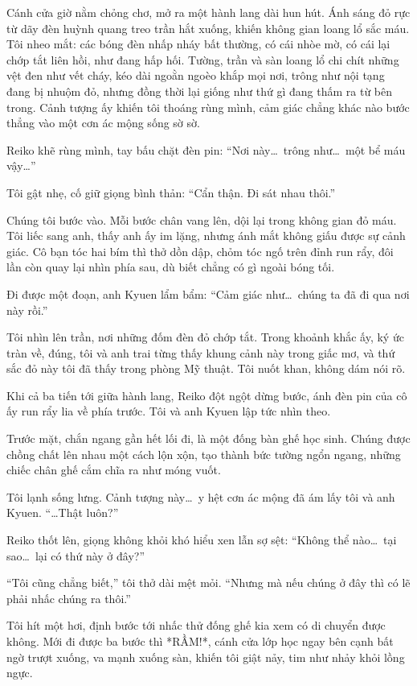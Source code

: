 \documentclass[../main.tex]{subfiles}
\begin{document}
Cánh cửa giờ nằm chỏng chơ, mở ra một hành lang dài hun hút. Ánh sáng đỏ rực từ dãy đèn huỳnh quang treo trần hắt xuống, khiến không gian loang lổ sắc máu. Tôi nheo mắt: các bóng đèn nhấp nháy bất thường, có cái nhòe mờ, có cái lại chớp tắt liên hồi, như đang hấp hối. Tường, trần và sàn loang lổ chi chít những vệt đen như vết cháy, kéo dài ngoằn ngoèo khắp mọi nơi, trông như nội tạng đang bị nhuộm đỏ, nhưng đồng thời lại giống như thứ gì đang thấm ra từ bên trong. Cảnh tượng ấy khiến tôi thoáng rùng mình, cảm giác chẳng khác nào bước thẳng vào một cơn ác mộng sống sờ sờ.


Reiko khẽ rùng mình, tay bấu chặt đèn pin: ``Nơi này\dots\ trông như\dots\ một bể máu vậy\dots''

Tôi gật nhẹ, cố giữ giọng bình thản: ``Cẩn thận. Đi sát nhau thôi.''

Chúng tôi bước vào. Mỗi bước chân vang lên, dội lại trong không gian đỏ máu. Tôi liếc sang anh, thấy anh ấy im lặng, nhưng ánh mắt không giấu được sự cảnh giác. Cô bạn tóc hai bím thì thở dồn dập, chỏm tóc ngố trên đỉnh run rẩy, đôi lần còn quay lại nhìn phía sau, dù biết chẳng có gì ngoài bóng tối.

Đi được một đoạn, anh Kyuen lẩm bẩm: ``Cảm giác như\dots\ chúng ta đã đi qua nơi này rồi.''

Tôi nhìn lên trần, nơi những đốm đèn đỏ chớp tắt. Trong khoảnh khắc ấy, ký ức tràn về, đúng, tôi và anh trai từng thấy khung cảnh này trong giấc mơ, và thứ sắc đỏ này tôi đã thấy trong phòng Mỹ thuật. Tôi nuốt khan, không dám nói rõ.

Khi cả ba tiến tới giữa hành lang, Reiko đột ngột dừng bước, ánh đèn pin của cô ấy run rẩy lia về phía trước. Tôi và anh Kyuen lập tức nhìn theo.

Trước mặt, chắn ngang gần hết lối đi, là một đống bàn ghế học sinh. Chúng được chồng chất lên nhau một cách lộn xộn, tạo thành bức tường ngổn ngang, những chiếc chân ghế cắm chĩa ra như móng vuốt.

Tôi lạnh sống lưng. Cảnh tượng này\dots\ y hệt cơn ác mộng đã ám lấy tôi và anh Kyuen. ``\dots Thật luôn?''

Reiko thốt lên, giọng không khỏi khó hiểu xen lẫn sợ sệt: ``Không thể nào\dots\ tại sao\dots\ lại có thứ này ở đây?''

``Tôi cũng chẳng biết,'' tôi thở dài mệt mỏi. ``Nhưng mà nếu chúng ở đây thì có lẽ phải nhấc chúng ra thôi.''

Tôi hít một hơi, định bước tới nhấc thử đống ghế kia xem có di chuyển được không. Mới đi được ba bước thì *RẦM!*, cánh cửa lớp học ngay bên cạnh bất ngờ trượt xuống, va mạnh xuống sàn, khiến tôi giật nảy, tim như nhảy khỏi lồng ngực.
\end{document}
